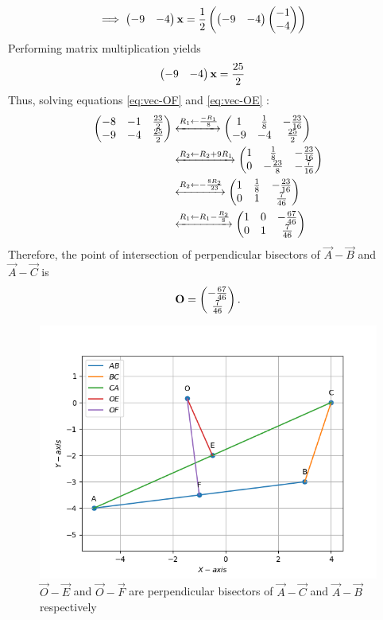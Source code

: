 \documentclass[10pt]{book}
\begin{document}
\begin{enumerate}[label=\thesection.\arabic*.,ref=\thesection.\theenumi]
\begin{align}
\implies \begin{pmatrix}-9&-4\end{pmatrix}\mathbf{x}&=\frac{1}{2}\left(\begin{pmatrix}-9&-4\end{pmatrix}\begin{pmatrix}-1\\-4\end{pmatrix}\right)
\end{align}
Performing matrix multiplication yields
\begin{align}
\myvec{-9&-4}\vec{x}&=\frac{25}{2}
\label{eq:vec-OE}
\end{align}
Thus, solving equations \eqref{eq:vec-OF} and \eqref{eq:vec-OE} :
\begin{align}
\begin{pmatrix}-8 & -1& \frac{23}{2} \\ -9 & -4 & \frac{25}{2}\end{pmatrix} &\xleftrightarrow[]{R_1 \leftarrow \frac{-R_1}{8}} \begin{pmatrix}1 & \frac{1}{8} & -\frac{23}{16} \\ -9 & -4 & \frac{25}{2}\end{pmatrix}\\
&\xleftrightarrow[]{R_2 \leftarrow R_2+9R_1}
\begin{pmatrix}1 & \frac{1}{8} & -\frac{23}{16} \\ 0 & -\frac{23}{8} & -\frac{7}{16}\end{pmatrix}\\ 
&\xleftrightarrow[]{R_2\leftarrow -\frac{8R_2}{23}} \begin{pmatrix}1 & \frac{1}{8} & -\frac{23}{16} \\ 0 & 1 & \frac{7}{46}\end{pmatrix}\\
&\xleftrightarrow[]{R_1\leftarrow R_1 - \frac{R_2}{8}}
 \begin{pmatrix}1 & 0 & -\frac{67}{46} \\ 0 & 1 & \frac{7}{46}\end{pmatrix}
\end{align}
Therefore, the point of intersection of perpendicular bisectors of $\vec{A}-\vec{B}$ and $\vec{A}-\vec{C}$ is 
\begin{align}
    \vec{O} = \myvec{-\frac{67}{46}\\ \frac{7}{46}}
    \label{eq:tri-O-bisecter}.
\end{align}

\begin{figure}[H]
\centering
\includegraphics[width=\columnwidth]{figs/OE_OF.png}
\caption{$\vec{O}-\vec{E}$ and $\vec{O}-\vec{F}$ are perpendicular bisectors of $\vec{A}-\vec{C}$ and $\vec{A}-\vec{B}$ respectively}
\label{fig:Figure_2}
\end{figure}


\end{enumerate}
\end{document}
